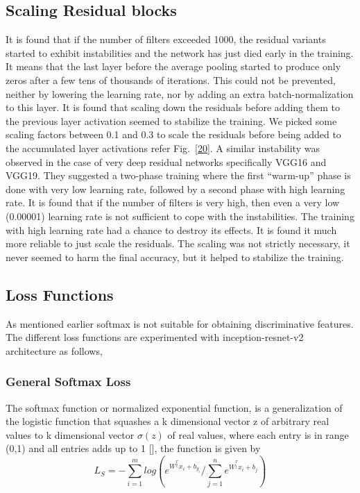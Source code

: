 \documentclass[a4paper,12pt, twoside]{NITKReport}
\begin{document}
\subsection{Scaling Residual blocks}
\par It is found that if the number of filters exceeded 1000, the residual variants started to exhibit instabilities and the network has just died early in the training. It means that the last layer before the average pooling started to produce only zeros after a few tens of thousands of iterations. This could not be prevented, neither by lowering the learning rate, nor by adding an extra batch-normalization to this layer. It is found that scaling down the residuals before adding them to the previous layer activation seemed to stabilize the
training. We picked some scaling factors between 0.1 and 0.3 to scale the residuals before being added to the accumulated layer activations refer Fig.~\ref{20}. A similar instability was observed in the case of very deep residual networks specifically VGG16 and VGG19. They suggested a two-phase training where the first “warm-up” phase is done with  very  low  learning  rate,  followed  by  a  second  phase with  high  learning  rate. It is found that if the number of filters is very high, then even a very low (0.00001) learning rate is not sufficient to cope with the instabilities. The training with high learning rate had a chance to destroy its effects. It is found it much more reliable to just scale the residuals. The  scaling  was  not  strictly  necessary,  it
never seemed to harm the final accuracy,  but it helped to stabilize the training.

\subsection{Loss Functions}
\par As mentioned earlier softmax is not suitable for obtaining discriminative features. The different loss functions are experimented with inception-resnet-v2 architecture as follows,

\subsubsection{General Softmax Loss}
\par  The softmax function or normalized exponential function, is a generalization of the logistic function that squashes a k dimensional vector z of arbitrary real values to k dimensional vector $\sigma (z)$ of real values, where each entry is in range (0,1) and all entries adds up to 1 [\cite{100}], the function is given by
\begin{equation}
L_{S} = -\sum_{i=1}^{m}log (e^{W^{_{y_{i}}^{T}}x_{i}+b_{y_{i}}} / \sum_{j=1}^{n} e^{W^{_{j}^{T}}x_{i}+b_{j}})
\end{equation}
\end{document}
